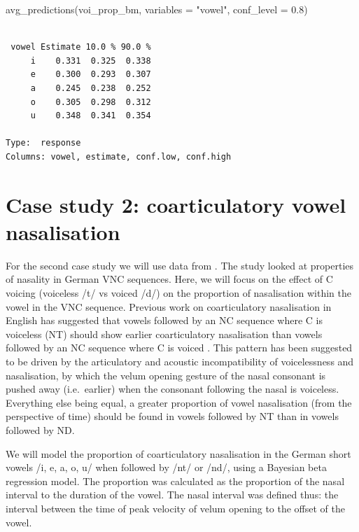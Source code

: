 \documentclass[
  authoryear,
  preprint,
  3p]{elsarticle}
\newenvironment{Shaded}{\begin{snugshade}}{\end{snugshade}}
\newcommand{\AttributeTok}[1]{\textcolor[rgb]{0.40,0.45,0.13}{#1}}
\newcommand{\FloatTok}[1]{\textcolor[rgb]{0.68,0.00,0.00}{#1}}
\newcommand{\FunctionTok}[1]{\textcolor[rgb]{0.28,0.35,0.67}{#1}}
\newcommand{\NormalTok}[1]{\textcolor[rgb]{0.00,0.23,0.31}{#1}}
\newcommand{\StringTok}[1]{\textcolor[rgb]{0.13,0.47,0.30}{#1}}
\begin{document}
\begin{Shaded}
\begin{Highlighting}[]
\FunctionTok{avg\_predictions}\NormalTok{(voi\_prop\_bm, }\AttributeTok{variables =} \StringTok{"vowel"}\NormalTok{, }\AttributeTok{conf\_level =} \FloatTok{0.8}\NormalTok{)}
\end{Highlighting}
\end{Shaded}

\begin{verbatim}

 vowel Estimate 10.0 % 90.0 %
     i    0.331  0.325  0.338
     e    0.300  0.293  0.307
     a    0.245  0.238  0.252
     o    0.305  0.298  0.312
     u    0.348  0.341  0.354

Type:  response 
Columns: vowel, estimate, conf.low, conf.high 
\end{verbatim}

\section{Case study 2: coarticulatory vowel
nasalisation}\label{case-study-2-coarticulatory-vowel-nasalisation}

For the second case study we will use data from \citet{carignan2021}.
The study looked at properties of nasality in German VNC sequences.
Here, we will focus on the effect of C voicing (voiceless /t/ vs voiced
/d/) on the proportion of nasalisation within the vowel in the VNC
sequence. Previous work on coarticulatory nasalisation in English has
suggested that vowels followed by an NC sequence where C is voiceless
(NT) should show earlier coarticulatory nasalisation than vowels
followed by an NC sequence where C is voiced \citep[ND, see review
in][]{carignan2021}. This pattern has been suggested to be driven by the
articulatory and acoustic incompatibility of voicelessness and
nasalisation, by which the velum opening gesture of the nasal consonant
is pushed away (i.e.~earlier) when the consonant following the nasal is
voiceless. Everything else being equal, a greater proportion of vowel
nasalisation (from the perspective of time) should be found in vowels
followed by NT than in vowels followed by ND.

We will model the proportion of coarticulatory nasalisation in the
German short vowels /i, e, a, o, u/ when followed by /nt/ or /nd/, using
a Bayesian beta regression model. The proportion was calculated as the
proportion of the nasal interval to the duration of the vowel. The nasal
interval was defined thus: the interval between the time of peak
velocity of velum opening to the offset of the vowel.
\end{document}
